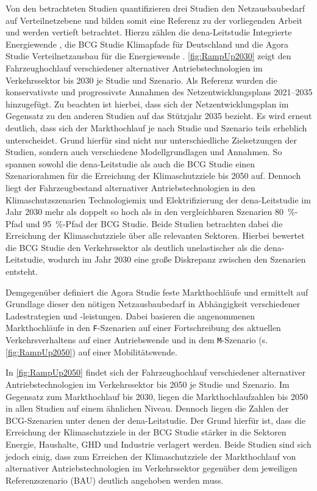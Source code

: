 Von den betrachteten Studien quantifizieren drei Studien den Netzausbaubedarf auf Verteilnetzebene und bilden somit eine Referenz zu der vorliegenden Arbeit und werden vertieft betrachtet.
Hierzu zählen die dena-Leitstudie \glqq Integrierte Energiewende\grqq{} \cite{DEAGH2018}, die BCG Studie \glqq Klimapfade für Deutschland\grqq{} \cite{BCG2018} und die Agora Studie \glqq Verteilnetzausbau für die Energiewende\grqq{} \cite{Agora2019}.
\autoref{fig:RampUp2030} zeigt den Fahrzeughochlauf verschiedener alternativer Antriebstechnologien im Verkehrssektor bis \num{2030} je Studie und Szenario.
Als Referenz wurden die konservativste und progressivste Annahmen des Netzentwicklungsplans \numrange[range-phrase=~{--}~]{2021}{2035} \cite{BNetzA2020} hinzugefügt.
Zu beachten ist hierbei, dass sich der Netzentwicklungsplan im Gegensatz zu den anderen Studien auf das Stützjahr \num{2035} bezieht.
Es wird erneut deutlich, dass sich der Markthochlauf je nach Studie und Szenario teils erheblich unterscheidet.
Grund hierfür sind nicht nur unterschiedliche Zielsetzungen der Studien, sondern auch verschiedene Modellgrundlagen und Annahmen.
So spannen sowohl die dena-Leitstudie als auch die BCG Studie einen Szenariorahmen für die Erreichung der Klimaschutzziele bis \num{2050} auf.
Dennoch liegt der Fahrzeugbestand alternativer Antriebstechnologien in den Klimaschutzszenarien \glqq Technologiemix\grqq{} und \glqq Elektrifizierung\grqq{} der dena-Leitstudie im Jahr 2030 mehr als doppelt so hoch als in den vergleichbaren Szenarien \glqq \SI{80}{\percent}-Pfad\grqq{} und \glqq \SI{95}{\percent}-Pfad\grqq{} der BCG Studie.
Beide Studien betrachten dabei die Erreichung der Klimaschutzziele über alle relevanten Sektoren.
Hierbei bewertet die BCG Studie den Verkehrssektor als deutlich unelastischer als die dena-Leitstudie, wodurch im Jahr \num{2030} eine große Diskrepanz zwischen den Szenarien entsteht.\medskip

Demgegenüber definiert die Agora Studie feste Markthochläufe und ermittelt auf Grundlage dieser den nötigen Netzausbaubedarf in Abhängigkeit verschiedener Ladestrategien und -leistungen.
Dabei basieren die angenommenen Markthochläufe in den \texttt{F}-Szenarien auf einer Fortschreibung des aktuellen Verkehrsverhaltens auf einer \glqq Antriebswende\grqq{} und in dem \texttt{M}-Szenario (s. \autoref{fig:RampUp2050}) auf einer \glqq Mobilitätswende\grqq{}.



In \autoref{fig:RampUp2050} findet sich der Fahrzeughochlauf verschiedener alternativer Antriebstechnologien im Verkehrssektor bis \num{2050} je Studie und Szenario.
Im Gegensatz zum Markthochlauf bis \num{2030}, liegen die Markthochlaufzahlen bis \num{2050} in allen Studien auf einem ähnlichen Niveau.
Dennoch liegen die Zahlen der BCG-Szenarien unter denen der dena-Leitstudie.
Der Grund hierfür ist, dass die Erreichung der Klimaschutzziele in der BCG Studie stärker in die Sektoren Energie, Haushalte, \gls{GHD} und Industrie verlagert werden.
Beide Studien sind sich jedoch einig, dass zum Erreichen der Klimaschutzziele der Markthochlauf von alternativer Antriebstechnologien im Verkehrssektor gegenüber dem jeweiligen Referenzszenario (\gls{BAU}) deutlich angehoben werden muss.


